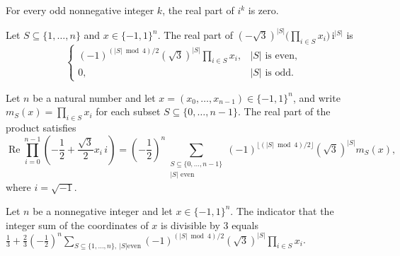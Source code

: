 \begin{theorem}
\label{FABL.re_I_pow_eq_zero_of_odd}
\leanok
{}
For every odd nonnegative integer $k$, the real part of $i^k$ is zero.
\end{theorem}

\begin{theorem}
\label{FABL.modThreeComplexTerm_re}
\leanok
{}
Let $S\subseteq\{1,\ldots,n\}$ and $x\in\{-1,1\}^n$. The real part of
$(-\sqrt{3})^{|S|}\bigl(\prod_{i\in S}x_i\bigr)\,\mathrm{i}^{|S|}$ is
$$\begin{cases}(-1)^{(|S|\bmod 4)/2}(\sqrt{3})^{|S|}\displaystyle\prod_{i\in
S}x_i,&|S|\text{ is even},\\0,&|S|\text{ is odd}.\end{cases}$$
\end{theorem}

\begin{theorem}
\label{FABL.modThreeCubicProduct_re}
\leanok
{}
Let $n$ be a natural number and let $x=(x_0,\ldots,x_{n-1})\in\{−1,1\}^n$, and write
$m_S(x)=\prod_{i\in S}x_i$ for each subset $S\subseteq\{0,\ldots,n-1\}$. The real part
of the product satisfies
\[\operatorname{Re}\prod_{i=0}^{n-1}\left(-\frac12+\frac{\sqrt3}{2}x_i\,i\right)=\left(-\frac12\right)^n\sum_{\substack{S\subseteq\{0,\ldots,n-1\}\\ |S|\text{ even}}}(-1)^{\lfloor (|S|\bmod 4)/2\rfloor}(\sqrt3)^{|S|}m_S(x),\]
where $i=\sqrt{-1}$.
\end{theorem}

\begin{theorem}
\label{FABL.modThree_fourier_expansion}
\leanok
{}
Let $n$ be a nonnegative integer and let $x\in\{-1,1\}^n$. The indicator that the
integer sum of the coordinates of $x$ is divisible by $3$ equals
$\frac13+\frac23(-\frac12)^n\sum_{S\subseteq\{1,\ldots,n\},\ |S|\text{
even}}(-1)^{(|S|\bmod 4)/2}(\sqrt3)^{|S|}\prod_{i\in S}x_i$.
\end{theorem}

